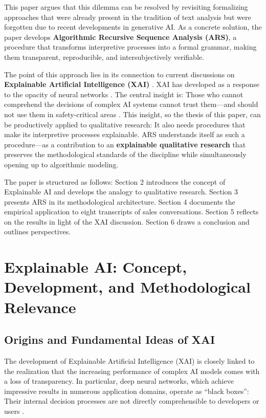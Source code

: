 \documentclass[
  12pt,
  a4paper,
  oneside,
  titlepage
]{article}
\begin{document}
This paper argues that this dilemma can be resolved by revisiting formalizing 
approaches that were already present in the tradition of text analysis but were 
forgotten due to recent developments in generative AI. As a concrete solution, the 
paper develops \textbf{Algorithmic Recursive Sequence Analysis (ARS)}, a procedure 
that transforms interpretive processes into a formal grammar, making them transparent, 
reproducible, and intersubjectively verifiable.

The point of this approach lies in its connection to current discussions on 
\textbf{Explainable Artificial Intelligence (XAI)} . XAI has developed as a response 
to the opacity of neural networks \citep{Samek2019, BarredoArrieta2020}. The central 
insight is: Those who cannot comprehend the decisions of complex AI systems cannot 
trust them—and should not use them in safety-critical areas \citep{Weller2019}. This 
insight, so the thesis of this paper, can be productively applied to qualitative 
research: It also needs procedures that make its interpretive processes explainable. 
ARS understands itself as such a procedure—as a contribution to an \textbf{explainable 
qualitative research} that preserves the methodological standards of the discipline 
while simultaneously opening up to algorithmic modeling.

The paper is structured as follows: Section 2 introduces the concept of Explainable 
AI and develops the analogy to qualitative research. Section 3 presents ARS in its 
methodological architecture. Section 4 documents the empirical application to eight 
transcripts of sales conversations. Section 5 reflects on the results in light of 
the XAI discussion. Section 6 draws a conclusion and outlines perspectives.

\section{Explainable AI: Concept, Development, and Methodological Relevance}

\subsection{Origins and Fundamental Ideas of XAI}

The development of Explainable Artificial Intelligence (XAI) is closely linked to the 
realization that the increasing performance of complex AI models comes with a loss of 
transparency. In particular, deep neural networks, which achieve impressive results 
in numerous application domains, operate as \enquote{black boxes}: Their internal 
decision processes are not directly comprehensible to developers or users 
\citep[ p.~2]{Samek2019}.
\end{document}

